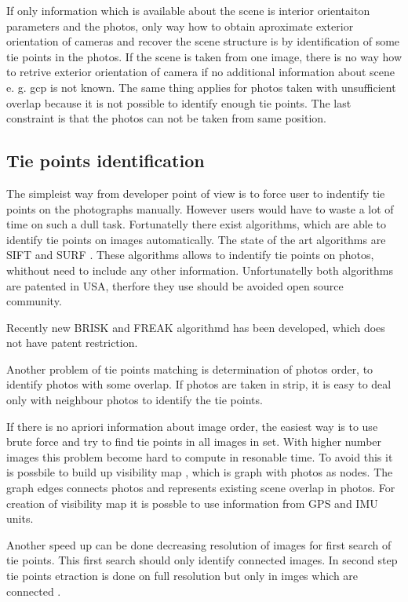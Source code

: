 \documentclass[a4paper,12pt]{report}
\begin{document}
If only information which is available about the scene is interior orientaiton parameters and the photos, 
only way how to obtain aproximate exterior orientation of cameras and recover the scene structure is 
by identification of some tie points in the photos. If the scene is taken from one image, there is no way how
to retrive exterior orientation of camera if no additional information about scene e. g. gcp is not known. 
The same thing applies for photos taken with  unsufficient overlap because it is not possible to 
identify enough tie points. The last constraint is that the photos can not be taken from same position.

\subsection{Tie points identification}

The simpleist way from developer point of view is to force user to indentify tie points on 
the photographs manually. However users would have to waste a lot of time on such a 
dull task. Fortunatelly there  exist algorithms, which are able to identify tie points on images
automatically. The state of the art algorithms are SIFT \cite{wiki:SIFT} and SURF \cite{wiki:SURF}.
These algorithms allows to indentify tie points on photos, whithout need to include any other information.
Unfortunatelly both algorithms are patented in USA, therfore they use should be avoided open source community.

Recently new BRISK \cite{leutenegger2011brisk} and FREAK \cite{alahi2012freak} algorithmd 
has been developed, which does not have patent restriction. 

Another problem of tie points matching is determination of photos order, to identify photos with some overlap. 
If photos are taken in strip, it is easy to deal only with neighbour photos to identify the tie points.

If there is no apriori information about image order, the easiest way is to use brute force and 
try to find tie points in all images in set. With higher number images this problem become 
hard to compute in resonable time. To avoid this it is possbile to build up visibility map \cite{barazzetti2010extraction}, 
which is graph with photos as nodes. The graph edges connects photos and represents existing scene overlap 
in photos. For creation of visibility map it is possble to use information from GPS and IMU units.

Another speed up can be done decreasing resolution of images 
for first search of tie points. This first search should only identify connected images.
In second step tie points etraction is done on full resolution but only in imges which 
are connected .
\end{document}
